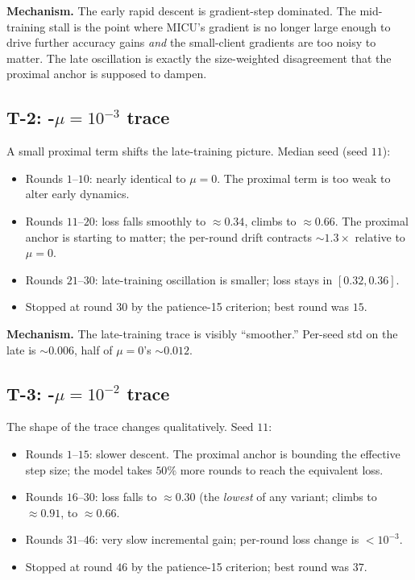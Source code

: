 \textbf{Mechanism.} The early rapid descent is gradient-step
dominated. The mid-training stall is the point where MICU's
gradient is no longer large enough to drive further accuracy
gains \emph{and} the small-client gradients are too noisy to
matter. The late oscillation is exactly the size-weighted
disagreement that the proximal anchor is supposed to dampen.

\subsection{T-2: \fedprox{}-$\mu\!=\!10^{-3}$ trace}

A small proximal term shifts the late-training picture. Median
seed (seed $11$):

\begin{itemize}[leftmargin=1.5em, itemsep=2pt, topsep=2pt]
    \item Rounds $1$--$10$: nearly identical to $\mu\!=\!0$. The
        proximal term is too weak to alter early dynamics.
    \item Rounds $11$--$20$: loss falls smoothly to $\approx
        0.34$, \auprc{} climbs to $\approx 0.66$. The
        proximal anchor is starting to matter; the per-round
        drift contracts $\sim$$1.3\!\times$ relative to
        $\mu\!=\!0$.
    \item Rounds $21$--$30$: late-training oscillation is
        smaller; loss stays in $[0.32, 0.36]$.
    \item Stopped at round $30$ by the patience-15 criterion;
        best round was $15$.
\end{itemize}

\textbf{Mechanism.} The late-training trace is visibly
``smoother.'' Per-seed std on the late \auprc{} is $\sim$$0.006$,
half of $\mu\!=\!0$'s $\sim$$0.012$.

\subsection{T-3: \fedprox{}-$\mu\!=\!10^{-2}$ trace}

The shape of the trace changes qualitatively. Seed $11$:

\begin{itemize}[leftmargin=1.5em, itemsep=2pt, topsep=2pt]
    \item Rounds $1$--$15$: slower descent. The proximal anchor
        is bounding the effective step size; the model takes
        $50\%$ more rounds to reach the equivalent loss.
    \item Rounds $16$--$30$: loss falls to $\approx 0.30$ (the
        \emph{lowest} of any \fedprox{} variant; \auroc{} climbs
        to $\approx 0.91$, \auprc{} to $\approx 0.66$.
    \item Rounds $31$--$46$: very slow incremental gain;
        per-round loss change is $< 10^{-3}$.
    \item Stopped at round $46$ by the patience-15 criterion;
        best round was $37$.
\end{itemize}


